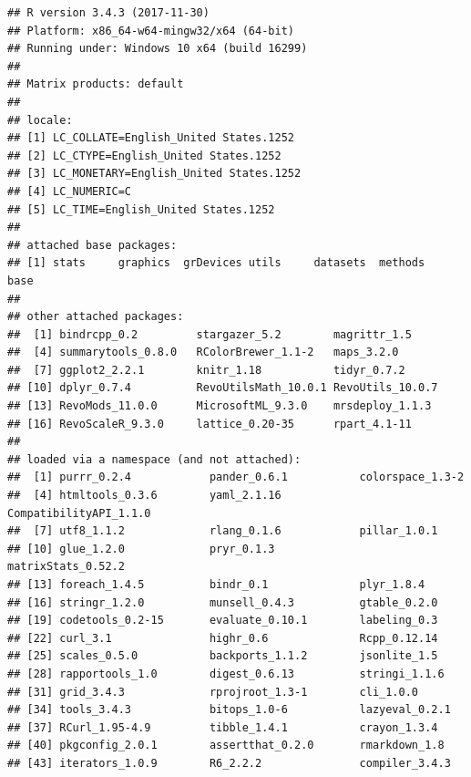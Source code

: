 \documentclass[]{article}
\begin{document}
\begin{verbatim}
## R version 3.4.3 (2017-11-30)
## Platform: x86_64-w64-mingw32/x64 (64-bit)
## Running under: Windows 10 x64 (build 16299)
## 
## Matrix products: default
## 
## locale:
## [1] LC_COLLATE=English_United States.1252 
## [2] LC_CTYPE=English_United States.1252   
## [3] LC_MONETARY=English_United States.1252
## [4] LC_NUMERIC=C                          
## [5] LC_TIME=English_United States.1252    
## 
## attached base packages:
## [1] stats     graphics  grDevices utils     datasets  methods   base     
## 
## other attached packages:
##  [1] bindrcpp_0.2         stargazer_5.2        magrittr_1.5        
##  [4] summarytools_0.8.0   RColorBrewer_1.1-2   maps_3.2.0          
##  [7] ggplot2_2.2.1        knitr_1.18           tidyr_0.7.2         
## [10] dplyr_0.7.4          RevoUtilsMath_10.0.1 RevoUtils_10.0.7    
## [13] RevoMods_11.0.0      MicrosoftML_9.3.0    mrsdeploy_1.1.3     
## [16] RevoScaleR_9.3.0     lattice_0.20-35      rpart_4.1-11        
## 
## loaded via a namespace (and not attached):
##  [1] purrr_0.2.4            pander_0.6.1           colorspace_1.3-2      
##  [4] htmltools_0.3.6        yaml_2.1.16            CompatibilityAPI_1.1.0
##  [7] utf8_1.1.2             rlang_0.1.6            pillar_1.0.1          
## [10] glue_1.2.0             pryr_0.1.3             matrixStats_0.52.2    
## [13] foreach_1.4.5          bindr_0.1              plyr_1.8.4            
## [16] stringr_1.2.0          munsell_0.4.3          gtable_0.2.0          
## [19] codetools_0.2-15       evaluate_0.10.1        labeling_0.3          
## [22] curl_3.1               highr_0.6              Rcpp_0.12.14          
## [25] scales_0.5.0           backports_1.1.2        jsonlite_1.5          
## [28] rapportools_1.0        digest_0.6.13          stringi_1.1.6         
## [31] grid_3.4.3             rprojroot_1.3-1        cli_1.0.0             
## [34] tools_3.4.3            bitops_1.0-6           lazyeval_0.2.1        
## [37] RCurl_1.95-4.9         tibble_1.4.1           crayon_1.3.4          
## [40] pkgconfig_2.0.1        assertthat_0.2.0       rmarkdown_1.8         
## [43] iterators_1.0.9        R6_2.2.2               compiler_3.4.3
\end{verbatim}
\end{document}
